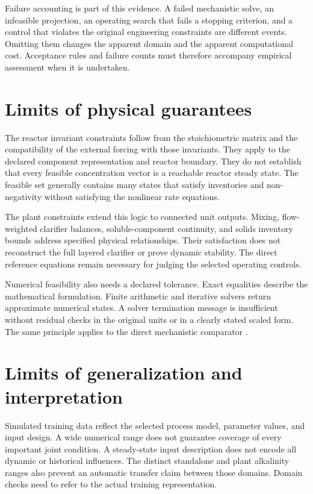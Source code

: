 Failure accounting is part of this evidence. A failed mechanistic solve, an infeasible projection, an operating search that fails a stopping criterion, and a control that violates the original engineering constraints are different events. Omitting them changes the apparent domain and the apparent computational cost. Acceptance rules and failure counts must therefore accompany empirical assessment when it is undertaken.

\section{Limits of physical guarantees}

The reactor invariant constraints follow from the stoichiometric matrix and the compatibility of the external forcing with those invariants. They apply to the declared component representation and reactor boundary. They do not establish that every feasible concentration vector is a reachable reactor steady state. The feasible set generally contains many states that satisfy inventories and non-negativity without satisfying the nonlinear rate equations.

The plant constraints extend this logic to connected unit outputs. Mixing, flow-weighted clarifier balances, soluble-component continuity, and solids inventory bounds address specified physical relationships. Their satisfaction does not reconstruct the full layered clarifier or prove dynamic stability. The direct reference equations remain necessary for judging the selected operating controls.

Numerical feasibility also needs a declared tolerance. Exact equalities describe the mathematical formulation. Finite arithmetic and iterative solvers return approximate numerical states. A solver termination message is insufficient without residual checks in the original units or in a clearly stated scaled form. The same principle applies to the direct mechanistic comparator \citep{Boyd2004,BuzziFerraris2013}.

\section{Limits of generalization and interpretation}

Simulated training data reflect the selected process model, parameter values, and input design. A wide numerical range does not guarantee coverage of every important joint condition. A steady-state input description does not encode all dynamic or historical influences. The distinct standalone and plant alkalinity ranges also prevent an automatic transfer claim between those domains. Domain checks need to refer to the actual training representation.

